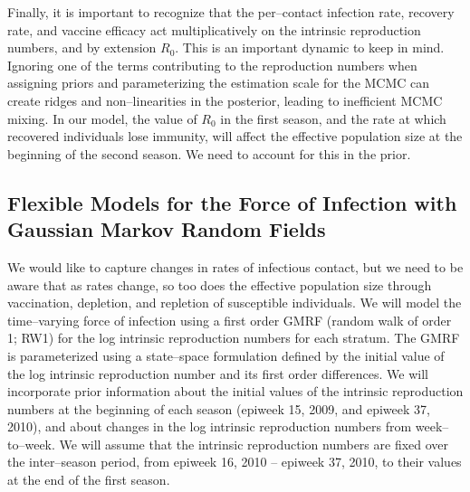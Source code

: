 Finally, it is important to recognize that the per--contact infection rate, recovery rate, and vaccine efficacy act multiplicatively on the intrinsic reproduction numbers, and by extension $ R_0 $. This is an important dynamic to keep in mind. Ignoring one of the terms contributing to the reproduction numbers when assigning priors and parameterizing the estimation scale for the MCMC can create ridges and non--linearities in the posterior, leading to inefficient MCMC mixing. In our model, the value of $ R_0 $ in the first season, and the rate at which recovered individuals lose immunity, will affect the effective population size at the beginning of the second season. We need to account for this in the prior.

\subsection{Flexible Models for the Force of Infection with Gaussian Markov Random Fields}
\label{subsec:flu_gmrf}

We would like to capture changes in rates of infectious contact, but we need to be aware that as rates change, so too does the effective population size through vaccination, depletion, and repletion of susceptible individuals. We will model the time--varying force of infection using a first order GMRF (random walk of order 1; RW1) for the log intrinsic reproduction numbers for each stratum. The GMRF is parameterized using a state--space formulation defined by the initial value of the log intrinsic reproduction number and its first order differences. We will incorporate prior information about the initial values of the intrinsic reproduction numbers at the beginning of each season (epiweek 15, 2009, and epiweek 37, 2010), and about changes in the log intrinsic reproduction numbers from week--to--week. We will assume that the intrinsic reproduction numbers are fixed over the inter--season period, from epiweek 16, 2010 -- epiweek 37, 2010, to their values at the end of the first season.


